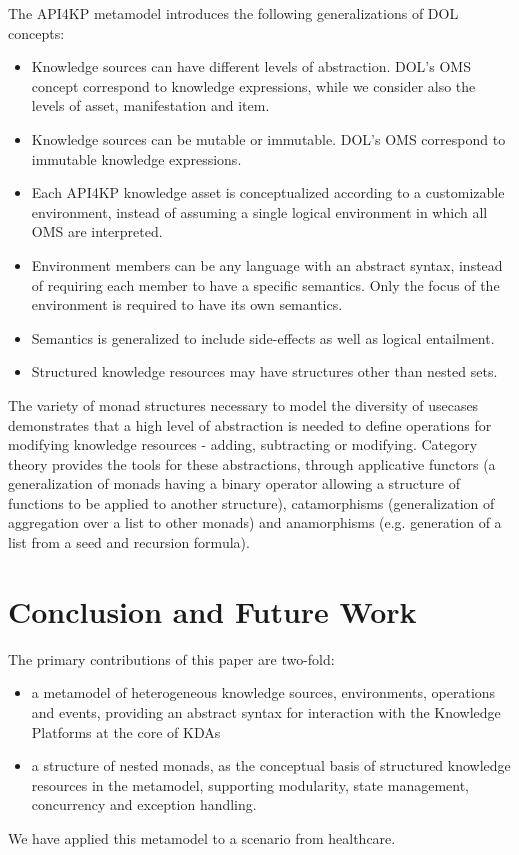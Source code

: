 \documentclass[runningheads]{llncs}
\begin{document}

The API4KP metamodel introduces the following generalizations of DOL concepts:
\begin{itemize}
\item Knowledge sources can have different levels of abstraction. DOL's OMS concept correspond to knowledge expressions, while we consider also the levels of asset, manifestation and item.
\item Knowledge sources can be mutable or immutable. DOL's OMS correspond to immutable knowledge expressions.
\item Each API4KP knowledge asset is conceptualized according to a customizable environment, instead of assuming a single logical environment in which all OMS are interpreted.
\item Environment members can be any language with an abstract syntax, instead of requiring each member to have a specific semantics. Only the focus of the environment is required to have its own semantics.
\item Semantics is generalized to include side-effects as well as logical entailment.
\item Structured knowledge resources may have structures other than nested sets.
\end{itemize}

The variety of monad structures necessary to model the diversity of usecases demonstrates that a high level of abstraction is needed to define operations for modifying knowledge resources - adding, subtracting or modifying. Category theory provides the tools for these abstractions, through applicative functors (a generalization of monads having a binary operator allowing a structure of functions to be applied to another structure), catamorphisms (generalization of aggregation over a list to other monads) and anamorphisms (e.g. generation of a list from a seed and recursion formula).

\vspace{-0.3cm}
\section{Conclusion and Future Work}
\label{sec:conc}
The primary contributions of this paper are two-fold:
\begin{itemize}
\item a metamodel of heterogeneous knowledge sources, environments, operations and events, providing an abstract syntax for interaction with the Knowledge Platforms at the core of KDAs
\item a structure of nested monads, as the conceptual basis of structured knowledge resources in the metamodel, supporting modularity, state management, concurrency and exception handling.
\end{itemize}
We have applied this metamodel to a scenario from healthcare.
\end{document}
